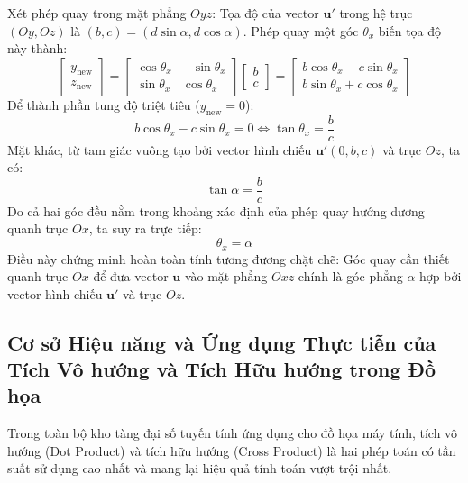 Xét phép quay trong mặt phẳng $Oyz$: Tọa độ của vector $\mathbf{u}'$ trong hệ trục $(Oy, Oz)$ là $(b, c) = (d\sin\alpha, d\cos\alpha)$. Phép quay một góc $\theta_x$ biến tọa độ này thành:
\begin{equation}
\begin{bmatrix} y_{\text{new}} \\ z_{\text{new}} \end{bmatrix} = \begin{bmatrix} \cos\theta_x & -\sin\theta_x \\ \sin\theta_x & \cos\theta_x \end{bmatrix} \begin{bmatrix} b \\ c \end{bmatrix} = \begin{bmatrix} b\cos\theta_x - c\sin\theta_x \\ b\sin\theta_x + c\cos\theta_x \end{bmatrix}
\end{equation}
Để thành phần tung độ triệt tiêu ($y_{\text{new}} = 0$):
\begin{equation}
b\cos\theta_x - c\sin\theta_x = 0 \iff \tan\theta_x = \frac{b}{c}
\end{equation}
Mặt khác, từ tam giác vuông tạo bởi vector hình chiếu $\mathbf{u}'(0, b, c)$ và trục $Oz$, ta có:
\begin{equation}
\tan\alpha = \frac{b}{c}
\end{equation}
Do cả hai góc đều nằm trong khoảng xác định của phép quay hướng dương quanh trục $Ox$, ta suy ra trực tiếp:
\begin{equation}
\theta_x = \alpha
\end{equation}
Điều này chứng minh hoàn toàn tính tương đương chặt chẽ: Góc quay cần thiết quanh trục $Ox$ để đưa vector $\mathbf{u}$ vào mặt phẳng $Oxz$ chính là góc phẳng $\alpha$ hợp bởi vector hình chiếu $\mathbf{u}'$ và trục $Oz$.

\subsection{Cơ sở Hiệu năng và Ứng dụng Thực tiễn của Tích Vô hướng và Tích Hữu hướng trong Đồ họa}
\label{subsec:dot_cross_product_applications}

Trong toàn bộ kho tàng đại số tuyến tính ứng dụng cho đồ họa máy tính, tích vô hướng (Dot Product) và tích hữu hướng (Cross Product) là hai phép toán có tần suất sử dụng cao nhất và mang lại hiệu quả tính toán vượt trội nhất.

